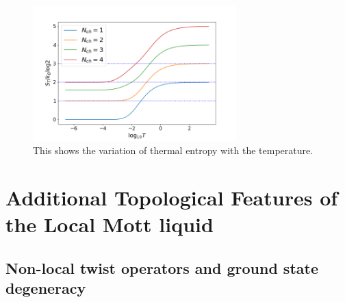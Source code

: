 \documentclass[reprint,onecolumn,prb,superscriptaddress]{revtex4-2}
\begin{document}
\begin{figure}
\centering
\includegraphics[width=0.7\textwidth]{ThermalEntanglementVSLogTemperature}
\caption{This shows the variation of thermal entropy with the temperature.}
\label{fig:thermal_entropy}
\end{figure}

\section{Additional Topological Features of the Local Mott liquid}
{\color{blue}\subsection{Non-local twist operators and ground state degeneracy}}
\end{document}
